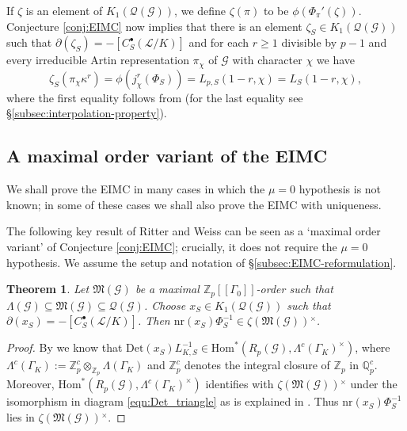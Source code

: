 \documentclass[12pt]{amsart}
\theoremstyle{plain}
\newtheorem{theorem}{Theorem}[section]
\theoremstyle{remark}
\theoremstyle{definition}
\numberwithin{equation}{section}
\begin{document}
If $\zeta$ is an element of $K_{1}(\mathcal{Q}(\mathcal{G}))$, we define $\zeta(\pi)$ to be $\phi(\Phi_{\pi}'(\zeta))$.
Conjecture \ref{conj:EIMC} now implies that there is an element $\zeta_{S} \in K_{1}(\mathcal{Q}(\mathcal{G}))$ such that
$\partial(\zeta_{S}) = -[C_{S}^{\bullet}(\mathcal{L}/K)]$ and for each $r \geq 1$ divisible by $p-1$
and every irreducible Artin representation $\pi_{\chi}$ of $\mathcal{G}$ with character $\chi$ we have
\[
\zeta_{S}(\pi_{\chi}\kappa^{r}) = \phi(j_{\chi}^{r}(\Phi_{S})) = L_{p,S}(1-r, \chi) = L_{S}(1-r,\chi),
\]
where the first equality follows from \cite[Lemma 2.3]{MR2822866} (for the last equality see \S \ref{subsec:interpolation-property}).

\subsection{A maximal order variant of the EIMC}

We shall prove the EIMC in many cases in which the $\mu=0$ hypothesis is not known;
in some of these cases we shall also prove the EIMC with uniqueness.

The following key result of Ritter and Weiss can be seen as a `maximal order variant' of Conjecture \ref{conj:EIMC}; 
crucially, it does not require the $\mu=0$ hypothesis.
We assume the setup and notation of \S \ref{subsec:EIMC-reformulation}.

\begin{theorem}\label{thm:EIMC-MaxOrd}
Let $\mathfrak{M}(\mathcal{G})$ be a maximal ${\mathbb{Z}}_{p}[[\Gamma_{0}]]$-order 
such that $\Lambda(\mathcal{G}) \subseteq \mathfrak{M}(\mathcal{G}) \subseteq \mathcal{Q}(\mathcal{G})$.
Choose $x_{S} \in K_{1}(\mathcal{Q}(\mathcal{G}))$ such that $\partial(x_{S}) = -[C_{S}^{\bullet}(\mathcal{L}/K)]$.
Then ${\mathrm{nr}}(x_{S})\Phi_{S}^{-1} \in \zeta(\mathfrak{M}(\mathcal{G})){^{\times}}$.
\end{theorem}

\begin{proof}
By \cite[Theorem 16]{MR2114937} we know that
${\mathrm{Det}}(x_{S})L_{K,S}^{-1} \in {\mathrm{Hom}}^{\ast}(R_{p}(\mathcal{G}), \Lambda^{c}(\Gamma_{K})^{\times})$,
where $\Lambda^{c}(\Gamma_{K}) := {\mathbb{Z}}_{p}^{c} \otimes_{{\mathbb{Z}}_{p}} \Lambda(\Gamma_{K})$ and ${\mathbb{Z}}_{p}^{c}$ denotes the integral closure
of ${\mathbb{Z}}_{p}$ in ${\mathbb{Q}}_{p}^{c}$.
Moreover, ${\mathrm{Hom}}^{\ast}(R_{p}(\mathcal{G}), \Lambda^{c}(\Gamma_{K})^{\times})$ identifies with $\zeta(\mathfrak{M}(\mathcal{G})){^{\times}}$
under the isomorphism in diagram \eqref{eqn:Det_triangle} as is explained in \cite[Remark H]{MR2114937}. Thus ${\mathrm{nr}}(x_{S}) \Phi_{S}^{-1}$ lies in $\zeta(\mathfrak{M}(\mathcal{G})){^{\times}}$.
\end{proof}
\end{document}
